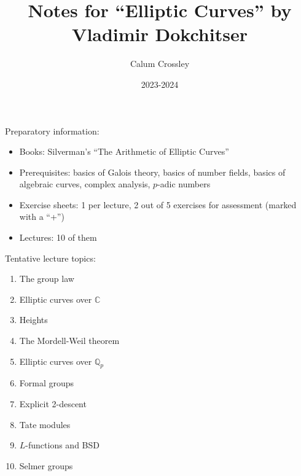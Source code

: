 \documentclass[a4paper]{article}
\title{Notes for ``Elliptic Curves'' by Vladimir Dokchitser}
\author{Calum Crossley}
\date{2023-2024}
\theoremstyle{plain}
\theoremstyle{remark}
\theoremstyle{definition}
\newcommand{\Q}{\mathbb{Q}}
\newcommand{\C}{\mathbb{C}}
\begin{document}
\maketitle

Preparatory information:
\begin{itemize}
    \item Books: Silverman's ``The Arithmetic of Elliptic Curves''
    \item Prerequisites: basics of Galois theory, basics of number fields,
        basics of algebraic curves, complex analysis, $p$-adic numbers
    \item Exercise sheets: 1 per lecture, 2 out of 5 exercises for assessment
        (marked with a ``+'')
    \item Lectures: 10 of them
\end{itemize}

Tentative lecture topics:
\begin{enumerate}[label=\arabic*)]
    \item The group law
    \item Elliptic curves over $\C$
    \item Heights
    \item The Mordell-Weil theorem
    \item Elliptic curves over $\Q_p$
    \item Formal groups
    \item Explicit 2-descent
    \item Tate modules
    \item $L$-functions and BSD
    \item Selmer groups
\end{enumerate}
\end{document}
